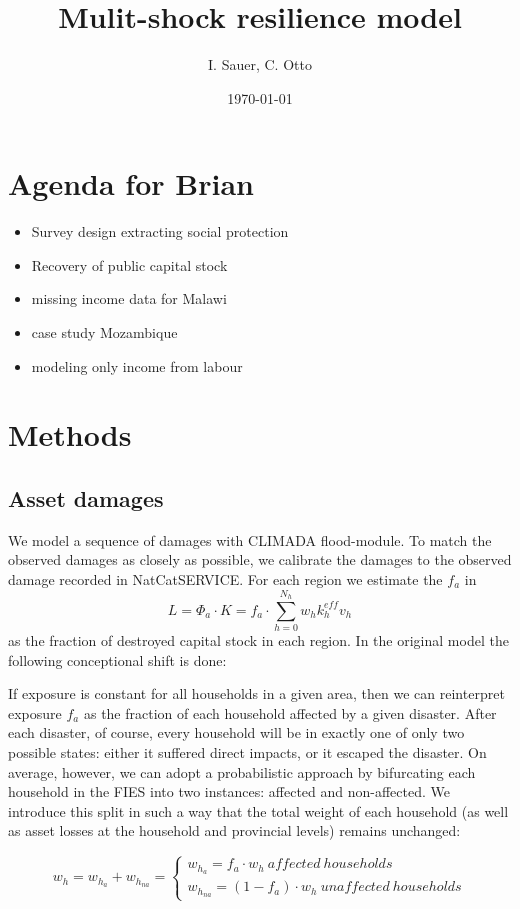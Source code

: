 \documentclass{article}
\author{I. Sauer, C. Otto}
\title{Mulit-shock resilience model}
\date{\today}
\begin{document}
\maketitle
\section{Agenda for Brian}
\begin{itemize}
	\item Survey design extracting social protection
	\item Recovery of public capital stock
	\item missing income data for Malawi
	\item case study Mozambique
	\item modeling only income from labour
\end{itemize}
\section{Methods}
\subsection{Asset damages}
We model a sequence of damages with CLIMADA flood-module. To match the observed damages as closely as possible, we calibrate the damages to the observed damage recorded in NatCatSERVICE. For each region we estimate the $f_a$ in 
\begin{equation}
L = \Phi_a \cdot K = f_a \cdot \sum\limits_{h=0}^{N_h} w_h k_h^{eff} v_h
\end{equation}
as the fraction of destroyed capital stock in each region. In the original model the following conceptional shift is done:

If exposure is constant for all households in a given area, then we can reinterpret exposure $f_a$
as the fraction of each household affected by a given disaster. After each disaster, of
course, every household will be in exactly one of only two possible states: either it
suffered direct impacts, or it escaped the disaster. On average, however, we can adopt
a probabilistic approach by bifurcating each household in the FIES into two instances:
affected and non-affected. We introduce this split in such a way that the total weight
of each household (as well as asset losses at the household and provincial levels)
remains unchanged:

\begin{equation}
w_h = w_{h_{a}} + w_{h_{na}}=
\begin{cases}
w_{h_{a}} = f_a \cdot w_h \ affected \ households\\
w_{h_{na}} =( 1-f_a) \cdot w_h \ unaffected \ households
\end{cases}
\end{equation}
\end{document}
